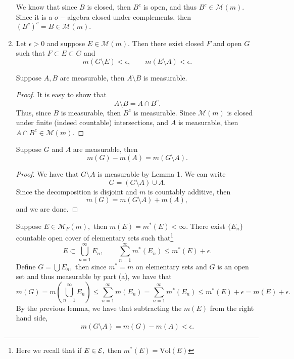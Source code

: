 \documentclass[11pt]{article}
\newcommand{\Vol}{\text{Vol}}
\newcommand{\sm}{\setminus}
\begin{document}
\begin{problem}
\begin{enumerate}
\begin{solution}
            We know that since $B$ is closed, then $B^c$ is open, and thus $B^c \in \mathcal{M}(m).$ Since it is a $\sigma-$algebra closed under complements, then $(B^c)^c = B \in \mathcal{M}(m).$
        \end{solution}
        \item Let $\epsilon>0$ and suppose $E \in \mathcal{M}(m).$ Then there exist closed $F$ and open $G$ such that $F \subset E \subset G$ and
        \[m(G\setminus E) < \epsilon, \qquad m(E \sm A)< \epsilon.\]
    \begin{solution}
        \begin{lemma}
            Suppose $A, B$ are measurable, then $A \setminus B$ is measurable. 
        \end{lemma}
        \begin{proof}
            It is easy to show that 
            \[A \setminus B = A \cap B^c.\] Thus, since $B$ is measurable, then $B^c$ is measurable. Since $\mathcal{M}(m)$ is closed under finite (indeed countable) intersections, and $A$ is measurable, then $A \cap B^c \in \mathcal{M}(m).$ 
        \end{proof}
    \begin{lemma}
        Suppose $G$ and $A$ are measurable, then 
        \[m(G) - m(A) = m(G\setminus A).\]
    \end{lemma}
    \begin{proof}
        We have that $G\setminus A$ is measurable by Lemma 1. We can write
        \[G = (G\setminus A) \cup A.\] Since the decomposition is disjoint and $m$ is countably additive, then 
        \[m(G) = m(G\setminus A) + m(A),\] and we are done.
    \end{proof}
        Suppose $E \in \mathcal{M}_F(m),$ then $m(E) = m^*(E)< \infty.$ There exist $\{E_n\}$ countable open cover of elementary sets such that\footnote{Here we recall that if $E\in \cal E,$ then $m^*(E) = \Vol(E)$} 
        \[E \subset \bigcup_{n=1}^\infty E_n, \qquad \sum_{n=1}^\infty m^*(E_n) \leq m^*(E) + \epsilon.\] Define $G = \bigcup E_n,$ then since $m^* = m$ on elementary sets and $G$ is an open set and thus measurable by part (a), we have that
        \[m(G) = m(\bigcup_{n=1}^\infty E_n) \leq \sum_{n=1}^\infty m(E_n) = \sum_{n=1}^\infty m^*(E_n) \leq m^*(E) + \epsilon = m(E) + \epsilon.\] By the previous lemma, we have that subtracting the $m(E)$ from the right hand side,
        \[m(G \setminus A) = m(G) - m(A) < \epsilon.\]


\end{solution}
\end{enumerate}
\end{problem}
\end{document}
